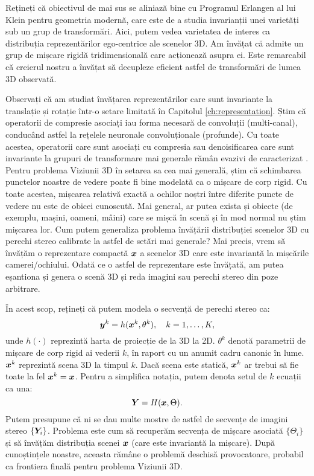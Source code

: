 \documentclass[../../book-main_ro.tex]{subfiles}
\begin{document}
\begin{remark}Rețineți că obiectivul de mai sus se aliniază bine cu Programul Erlangen al lui Klein pentru geometria modernă, care este de a studia invarianții unei varietăți sub un grup de transformări. Aici, putem vedea varietatea de interes ca distribuția reprezentărilor ego-centrice ale scenelor 3D. Am învățat că admite un grup de mișcare rigidă tridimensională care acționează asupra ei. Este remarcabil că creierul nostru a învățat să decupleze eficient astfel de transformări de lumea 3D observată.
\end{remark}


Observați că am studiat învățarea reprezentărilor care sunt invariante la translație și rotație într-o setare limitată în Capitolul \ref{ch:representation}. Știm că operatorii de compresie asociați iau forma necesară de convoluții (multi-canal), conducând astfel la rețelele neuronale convoluționale (profunde). Cu toate acestea, operatorii care sunt asociați cu compresia sau denoisificarea care sunt invariante la grupuri de transformare mai generale rămân evazivi de caracterizat \cite{cohen2016group}.
Pentru problema Viziunii 3D în setarea sa cea mai generală, știm că schimbarea punctelor noastre de vedere poate fi bine modelată ca o mișcare de corp rigid. Cu toate acestea, mișcarea relativă exactă a ochilor noștri între diferite puncte de vedere nu este de obicei cunoscută. Mai general, ar putea exista și obiecte (de exemplu, mașini, oameni, mâini) care se mișcă în scenă și în mod normal nu știm mișcarea lor. Cum putem generaliza problema învățării distribuției scenelor 3D cu perechi stereo calibrate la astfel de setări mai generale? Mai precis, vrem să învățăm o reprezentare compactă $\bm{x}$ a scenelor 3D care este invariantă la mișcările camerei/ochiului. Odată ce o astfel de reprezentare este învățată, am putea eșantiona și genera o scenă 3D și reda imagini sau perechi stereo din poze arbitrare.


În acest scop, rețineți că putem modela o secvență de perechi stereo ca:
\begin{equation}
    \bm{y}^k = h(\bm{x}^k, \theta^k), \quad k=1, \ldots, K,
\end{equation}
unde $h(\cdot)$ reprezintă harta de proiecție de la 3D la 2D. $\theta^k$ denotă parametrii de mișcare de corp rigid ai vederii $k$, în raport cu un anumit cadru canonic în lume. $\bm{x}^k$ reprezintă scena 3D la timpul $k$. Dacă scena este statică, $\bm{x}^k$ ar trebui să fie toate la fel $\bm{x}^k = \bm{x}$. Pentru a simplifica notația, putem denota setul de $k$ ecuații ca una:
\begin{equation}
    \bm{Y} = H(\bm{x},\Theta). 
\end{equation}
Putem presupune că ni se dau multe mostre de astfel de secvențe de imagini stereo $\{\bm{Y}_i\}$. Problema este cum să recuperăm secvența de mișcare asociată $\{\Theta_i\}$ și să învățăm distribuția scenei $\bm{x}$ (care este invariantă la mișcare). După cunoștințele noastre, aceasta rămâne o problemă deschisă provocatoare, probabil ca frontiera finală pentru problema Viziunii 3D.
\end{document}
